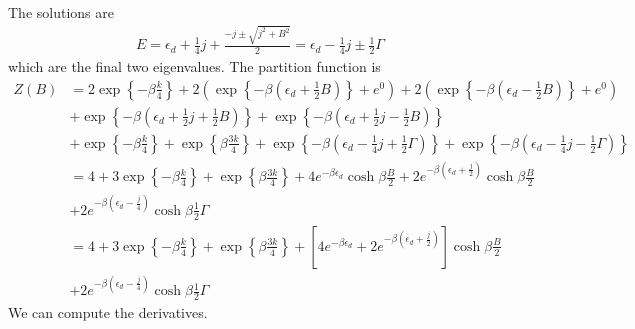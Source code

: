 \documentclass[12pt,twoside]{article}
\numberwithin{equation}{section}
\begin{document}
The solutions are
\begin{equation}\begin{aligned}
	E = \epsilon_d + \frac{1}{4}j + \frac{-j \pm \sqrt{j^2 + B^2}}{2} = \epsilon_d - \frac{1}{4}j \pm \frac{1}{2}\Gamma
\end{aligned}\end{equation}
which are the final two eigenvalues.
\pb The partition function is
\begin{equation}\begin{aligned}
	Z(B) &= 2 \exp\left\{-\beta \frac{k}{4}\right\} + 2\left( \exp\left\{-\beta\left(\epsilon_d + \frac{1}{2} B\right)\right\} + e^0\right) + 2\left( \exp\left\{-\beta\left(\epsilon_d - \frac{1}{2} B\right)\right\} + e^0\right) \\
	     &+ \exp\left\{-\beta\left(\epsilon_d + \frac{1}{2}j + \frac{1}{2} B\right)\right\} + \exp\left\{-\beta\left(\epsilon_d + \frac{1}{2}j - \frac{1}{2} B\right)\right\} \\
	     &+ \exp\left\{-\beta \frac{k}{4}\right\} + \exp\left\{\beta \frac{3k}{4}\right\} + \exp\left\{-\beta\left(\epsilon_d - \frac{1}{4}j + \frac{1}{2}\Gamma\right)\right\} + \exp\left\{-\beta\left( \epsilon_d- \frac{1}{4}j - \frac{1}{2}\Gamma\right)\right\}\\
	     &= 4 + 3\exp\left\{-\beta \frac{k}{4}\right\} + \exp\left\{\beta \frac{3k}{4}\right\} + 4e^{-\beta \epsilon_d}\cosh \beta \frac{B}{2} + 2e^{-\beta \left(\epsilon_d + \frac{j}{2}\right)}\cosh \beta \frac{B}{2}\\
	     &+ 2e^{-\beta\left(\epsilon_d - \frac{j}{4}\right)}\cosh \beta \frac{1}{2}\Gamma\\
	     &= 4 + 3\exp\left\{-\beta \frac{k}{4}\right\} + \exp\left\{\beta \frac{3k}{4}\right\} + \left[4e^{-\beta \epsilon_d} + 2e^{-\beta \left(\epsilon_d + \frac{j}{2}\right)}\right]\cosh \beta \frac{B}{2} \\
	     &+ 2e^{-\beta\left(\epsilon_d - \frac{j}{4}\right)}\cosh \beta \frac{1}{2}\Gamma
\end{aligned}\end{equation}
We can compute the derivatives.
\end{document}
